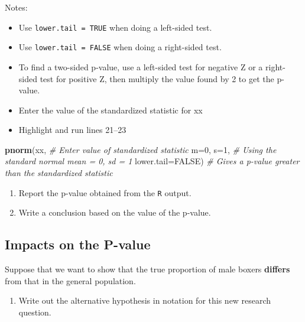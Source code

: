 \documentclass[
]{report}
\newenvironment{Shaded}{\begin{snugshade}}{\end{snugshade}}
\newcommand{\AttributeTok}[1]{\textcolor[rgb]{0.13,0.29,0.53}{#1}}
\newcommand{\CommentTok}[1]{\textcolor[rgb]{0.56,0.35,0.01}{\textit{#1}}}
\newcommand{\ConstantTok}[1]{\textcolor[rgb]{0.56,0.35,0.01}{#1}}
\newcommand{\DecValTok}[1]{\textcolor[rgb]{0.00,0.00,0.81}{#1}}
\newcommand{\FunctionTok}[1]{\textcolor[rgb]{0.13,0.29,0.53}{\textbf{#1}}}
\newcommand{\NormalTok}[1]{#1}
\providecommand{\tightlist}{%
  \setlength{\itemsep}{0pt}\setlength{\parskip}{0pt}}
\begin{document}
Notes:

\begin{itemize}
\item
  Use \texttt{lower.tail\ =\ TRUE} when doing a left-sided test.
\item
  Use \texttt{lower.tail\ =\ FALSE} when doing a right-sided test.
\item
  To find a two-sided p-value, use a left-sided test for negative Z or a right-sided test for positive Z, then multiply the value found by 2 to get the p-value.
\item
  Enter the value of the standardized statistic for xx
\item
  Highlight and run lines 21--23
\end{itemize}

\begin{Shaded}
\begin{Highlighting}[]
\FunctionTok{pnorm}\NormalTok{(xx, }\CommentTok{\# Enter value of standardized statistic}
      \AttributeTok{m=}\DecValTok{0}\NormalTok{, }\AttributeTok{s=}\DecValTok{1}\NormalTok{, }\CommentTok{\# Using the standard normal mean = 0, sd = 1}
      \AttributeTok{lower.tail=}\ConstantTok{FALSE}\NormalTok{) }\CommentTok{\# Gives a p{-}value greater than the standardized statistic}
\end{Highlighting}
\end{Shaded}

\begin{enumerate}
\def\labelenumi{\arabic{enumi}.}
\setcounter{enumi}{10}
\item
  Report the p-value obtained from the \texttt{R} output.
  \vspace{0.3in}
\item
  Write a conclusion based on the value of the p-value.
\end{enumerate}

\vspace{0.6in}

\subsection*{Impacts on the P-value}\label{impacts-on-the-p-value}

Suppose that we want to show that the true proportion of male boxers \textbf{differs} from that in the general population.

\begin{enumerate}
\def\labelenumi{\arabic{enumi}.}
\setcounter{enumi}{12}
\tightlist
\item
  Write out the alternative hypothesis in notation for this new research question.
\end{enumerate}
\end{document}
